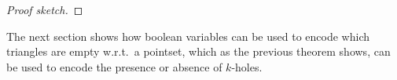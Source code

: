 \begin{proof}[Proof sketch]
\end{proof}
    
The next section shows how boolean variables can be used to encode which triangles are empty w.r.t.~a pointset, which as the previous theorem shows, can be used to encode the presence or absence of $k$-holes.
